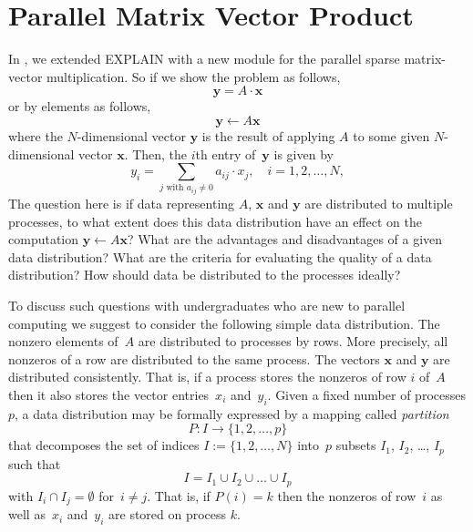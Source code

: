 \documentclass[12pt, twoside]{book}
\newcommand{\mat}[1]{\ensuremath{#1}}
\newcommand{\vek}[1]{{\ensuremath{\mathbf #1}}}
\begin{document}
\section{Parallel Matrix Vector Product}

In \cite{2015:3}, we extended EXPLAIN with a new module for
the parallel sparse matrix-vector multiplication.
So if we show the problem as follows,
$$
\vek{y} = \mat{A}\cdot \vek{x}
$$
or by elements as follows,
\begin{equation}
\label{e.yax}
\vek{y} \leftarrow \mat{A} \vek{x}
\end{equation}
where the $N$-dimensional vector $\vek{y}$ is the result of applying \mat{A} to some
given $N$-dimen\-sional vector $\vek{x}$. Then, the $i$th entry of~$\vek{y}$ is given by
\begin{equation}
\label{e.mvp}
y_i = \sum_{j \text{ with } a_{ij} \neq 0} a_{ij} \cdot x_j ,
\quad
i = 1, 2, \dots, N,
\end{equation}
The question here is if data representing \mat{A}, \vek{x} and
\vek{y} are distributed to multiple processes, to what extent does this data distribution
have an effect on the computation $\vek{y} \leftarrow \mat{A} \vek{x}$? What are the
advantages and disadvantages of a given data distribution? What are the criteria for
evaluating the quality of a data distribution? How should data be distributed to the
processes ideally?


To discuss such questions with undergraduates who are new to parallel computing we
suggest to consider the following simple data distribution. The nonzero elements
of~\mat{A} are distributed to processes by rows. More precisely, all nonzeros of a row
are distributed to the same process. The vectors \vek{x} and \vek{y} are distributed
consistently. That is, if a process stores the nonzeros of row $i$ of~\mat{A} then it
also stores the vector entries~$x_i$ and~$y_i$. Given a fixed number of processes $p$, a
data distribution may be formally expressed by a mapping called \emph{partition}
$$
P: I \rightarrow \{1, 2, \dots, p\}
$$
that decomposes the set of indices $I := \{1, 2, \dots, N\}$ into~$p$ subsets $I_1$,
$I_2$, \dots, $I_p$ such that
$$
I = I_1 \cup I_2 \cup \dots \cup I_p
$$
with $I_i \cap I_j = \emptyset$ for~$i \neq j$. That is, if $P(i)=k$ then the nonzeros of
row~$i$ as well as~$x_i$ and~$y_i$ are stored on process $k$.
\end{document}
